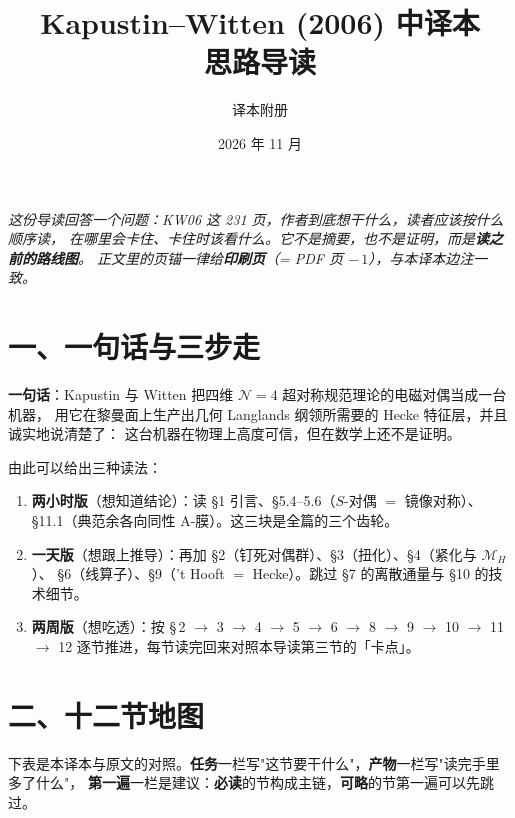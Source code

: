 \documentclass[11pt,a4paper]{article}
\title{\bfseries Kapustin--Witten (2006) 中译本\\[4pt]\large 思路导读}
\author{译本附册}
\date{2026 年 11 月}
\newcommand{\MH}{\mathcal{M}_H}
\newcommand{\Nfour}{\mathcal{N}=4}
\newcommand{\kw}{\textsf{KW06}}
\begin{document}
\maketitle
\thispagestyle{empty}

\begin{center}
\begin{minipage}{0.92\textwidth}
\small\itshape
这份导读回答一个问题：\kw{} 这 231 页，作者到底想干什么，读者应该按什么顺序读，
在哪里会卡住、卡住时该看什么。它不是摘要，也不是证明，而是\textbf{读之前的路线图}。
正文里的页锚一律给\textbf{印刷页}（= PDF 页 $-\,1$），与本译本边注一致。
\end{minipage}
\end{center}

\vspace{1em}

\section*{一、一句话与三步走}

\textbf{一句话}：Kapustin 与 Witten 把四维 $\Nfour$ 超对称规范理论的电磁对偶当成一台机器，
用它在黎曼面上生产出几何 Langlands 纲领所需要的 Hecke 特征层，并且诚实地说清楚了：
这台机器在物理上高度可信，但在数学上还不是证明。

由此可以给出三种读法：

\begin{enumerate}[label=(\arabic*)]
  \item \textbf{两小时版}（想知道结论）：读 \S1 引言、\S5.4--5.6（$S$-对偶 $=$ 镜像对称）、
        \S11.1（典范余各向同性 A-膜）。这三块是全篇的三个齿轮。
  \item \textbf{一天版}（想跟上推导）：再加 \S2（钉死对偶群）、\S3（扭化）、\S4（紧化与 $\MH$）、
        \S6（线算子）、\S9（'t Hooft $=$ Hecke）。跳过 \S7 的离散通量与 \S10 的技术细节。
  \item \textbf{两周版}（想吃透）：按 \S\,2 $\to$ 3 $\to$ 4 $\to$ 5 $\to$ 6 $\to$ 8 $\to$ 9 $\to$ 10 $\to$ 11 $\to$ 12
        逐节推进，每节读完回来对照本导读第三节的「卡点」。
\end{enumerate}

\section*{二、十二节地图}

下表是本译本与原文的对照。\textbf{任务}一栏写"这节要干什么"，\textbf{产物}一栏写"读完手里多了什么"，
\textbf{第一遍}一栏是建议：\textbf{必读}的节构成主链，\textbf{可略}的节第一遍可以先跳过。
\end{document}

